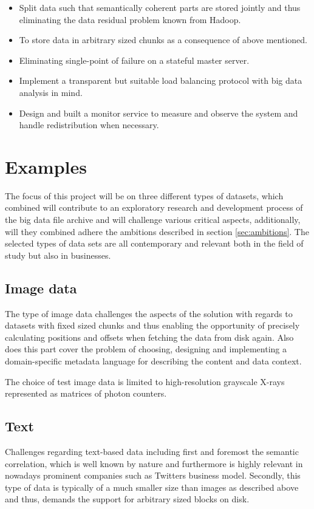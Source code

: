 \vspace*{3mm}
\begin{itemize}
	\item Split data such that semantically coherent parts are stored jointly and thus eliminating the data residual problem known from Hadoop.
	\item To store data in arbitrary sized chunks as a consequence of above mentioned.
	\item Eliminating single-point of failure on a stateful master server.
	\item Implement a transparent but suitable load balancing protocol with big data analysis in mind.
	\item Design and built a monitor service to measure and observe the system and handle redistribution when necessary.
\end{itemize}
\vspace*{3mm}

\section{Examples}
The focus of this project will be on three different types of datasets, which combined will contribute to an exploratory research and development process of the big data file archive and will challenge various critical aspects, additionally, will they combined adhere the ambitions described in section \ref{sec:ambitions}. The selected types of data sets are all contemporary and relevant both in the field of study but also in businesses.

\subsection*{Image data}
The type of image data challenges the aspects of the solution with regards to datasets with fixed sized chunks and thus enabling the opportunity of precisely calculating positions and offsets when fetching the data from disk again. Also does this part cover the problem of choosing, designing and implementing a domain-specific metadata language for describing the content and data context. 

The choice of test image data is limited to high-resolution grayscale X-rays represented as matrices of photon counters.

\subsection*{Text}
Challenges regarding text-based data including first and foremost the semantic correlation, which is well known by nature and furthermore is highly relevant in nowadays prominent companies such as Twitters business model. Secondly, this type of data is typically of a much smaller size than \eg images as described above and thus, demands the support for arbitrary sized blocks on disk. 

